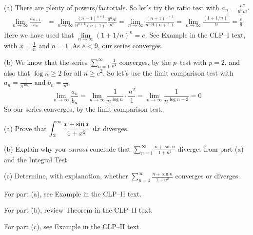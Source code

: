 \begin{solution}
(a)  There are plenty of powers/factorials. So let's try the ratio test
with $a_n= \frac{n^n}{9^n n!}$.
\begin{align*}
\lim_{n\rightarrow\infty}\frac{a_{n+1}}{a_n}
&=\lim_{n\rightarrow\infty}\frac{(n+1)^{n+1}}{9^{n+1}(n+1)!}\frac{9^nn!}{n^n}
=\lim_{n\rightarrow\infty}\frac{(n+1)^{n+1}}{n^n\,9\,(n+1)}
=\lim_{n\rightarrow\infty}\frac{(1+1/n)^n}{9}
=\frac{e}{9}
\end{align*}
Here we have used that $\lim\limits_{n\rightarrow\infty}(1+1/n)^n=e$.
See Example  in the CLP--I text,
with $x=\frac{1}{n}$ and $a=1$. As $e<9$, our series converges.

\noindent (b)  We know that the series $\sum_{n=1}^\infty \frac{1}{n^2}$ converges,
by the $p$--test with $p=2$, and also that $\log n \ge 2$ for all $n\ge e^2$.
So let's use the limit comparison test with $a_n=\frac{1}{n^{\log n}}$ and
$b_n=\frac{1}{n^2}$.
\begin{equation*}
\lim_{n\rightarrow\infty}\frac{a_n}{b_n}
=\lim_{n\rightarrow\infty}\frac{1}{n^{\log n}}\cdot\frac{n^2}{1}
=\lim_{n\rightarrow\infty}\frac{1}{n^{\log n-2}}
=0
\end{equation*}
So our series converges, by the limit comparison test.

\end{solution}


\begin{Mquestion}[2013A]
(a)
Prove that $\displaystyle \int_2^\infty\frac{x+\sin x}{1+x^2}\ \mathrm{d}x$ diverges.

\noindent (b)
Explain why you \emph{cannot} conclude that
 $\displaystyle\sum\limits_{n=1}^\infty \frac{n+\sin n}{1+n^2}$
diverges from part (a) and the Integral Test.

\noindent (c)
Determine, with explanation, whether
$\displaystyle\sum\limits_{n=1}^\infty \frac{n+\sin n}{1+n^2}$
converges or diverges.
\end{Mquestion}

\begin{hint}
For part (a),  see Example  in the
CLP--II text.

\noindent
For part (b), review  Theorem   in the
CLP--II text.

\noindent
For part (c),  see Example  in the
CLP--II text.
\end{hint}

